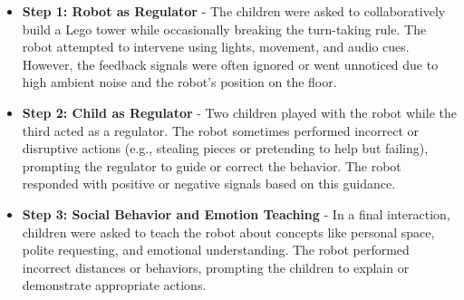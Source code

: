 \documentclass[a4paper]{usiinfbachelorproject}
\begin{document}
\begin{itemize}
    \item \textbf{Step 1: Robot as Regulator} - The children were asked to collaboratively build a Lego tower while occasionally breaking the turn-taking rule.
          The robot attempted to intervene using lights, movement, and audio cues.
          However, the feedback signals were often ignored or went unnoticed due to high ambient noise and the robot's position on the floor.
    \item \textbf{Step 2: Child as Regulator} - Two children played with the robot while the third acted as a regulator.
          The robot sometimes performed incorrect or disruptive actions (e.g., stealing pieces or pretending to help but failing), prompting the regulator to guide or correct the behavior.
          The robot responded with positive or negative signals based on this guidance.
    \item \textbf{Step 3: Social Behavior and Emotion Teaching} - In a final interaction, children were asked to teach the robot about concepts like personal space, polite requesting, and emotional understanding.
          The robot performed incorrect distances or behaviors, prompting the children to explain or demonstrate appropriate actions.
\end{itemize}
\end{document}

